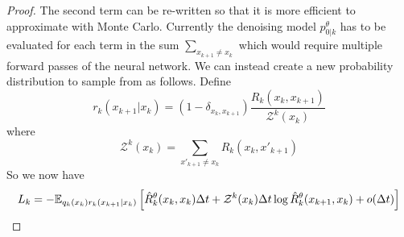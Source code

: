 \documentclass{article}
\begin{document}
\begin{proof}
The second term can be re-written so that it is more efficient to approximate with Monte Carlo. Currently the denoising model $p_{0|k}^\theta$ has to be evaluated for each term in the sum $\sum_{x_{k+1} \neq x_k}$ which would require multiple forward passes of the neural network. We can instead create a new probability distribution to sample from as follows. Define
\begin{equation}
    r_k(x_{k+1} | x_k) = (1 - \delta_{x_k, x_{k+1}} ) \frac{R_k(x_k, x_{k+1})}{\mathcal{Z}^k(x_k)}
\end{equation}
where
\begin{equation}
    \mathcal{Z}^k(x_k) = \sum_{x'_{k+1} \neq x_k} R_k(x_k, x'_{k+1})
\end{equation}
So we now have
\begin{equation}
    L_k = -\mathbb{E}_{q_k(x_k) r_k(x_{k+1}|x_k) } \left[ \hat{R}_k^\theta(x_k, x_k) \Delta t + \mathcal{Z}^k(x_k) \Delta t \log \hat{R}_k^\theta(x_{k+1}, x_k) + o(\Delta t) \right]
\end{equation}




\end{proof}
\end{document}

